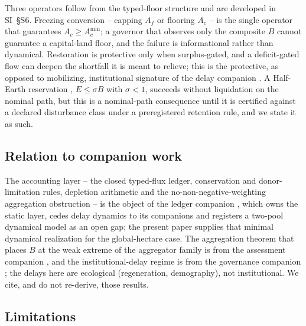 \documentclass[preprint,12pt,authoryear]{elsarticle}
\newcommand{\Acmin}{A_c^{\min}}
\begin{document}
Three operators follow from the typed-floor structure and are developed in SI~\S S6. Freezing conversion -- capping $A_f$ or flooring $A_c$ -- is the single operator that guarantees $A_c\ge\Acmin$; a governor that observes only the composite $B$ cannot guarantee a capital-land floor, and the failure is informational rather than dynamical. Restoration is protective only when surplus-gated, and a deficit-gated flow can deepen the shortfall it is meant to relieve; this is the protective, as opposed to mobilizing, institutional signature of the delay companion \citep{Abaee2026a}. A Half-Earth reservation \citep{Wilson2016}, $E\le\sigma B$ with $\sigma<1$, succeeds without liquidation on the nominal path, but this is a nominal-path consequence until it is certified against a declared disturbance class under a preregistered retention rule, and we state it as such.

\subsection{Relation to companion work}

The accounting layer -- the closed typed-flux ledger, conservation and donor-limitation rules, depletion arithmetic and the no-non-negative-weighting aggregation obstruction -- is the object of the ledger companion \citep{Abaee2026c}, which owns the static layer, cedes delay dynamics to its companions and registers a two-pool dynamical model as an open gap; the present paper supplies that minimal dynamical realization for the global-hectare case. The aggregation theorem that places $B$ at the weak extreme of the aggregator family is from the assessment companion \citep{Abaee2026b}, and the institutional-delay regime is from the governance companion \citep{Abaee2026a}; the delays here are ecological (regeneration, demography), not institutional. We cite, and do not re-derive, those results.

\subsection{Limitations}
\end{document}
